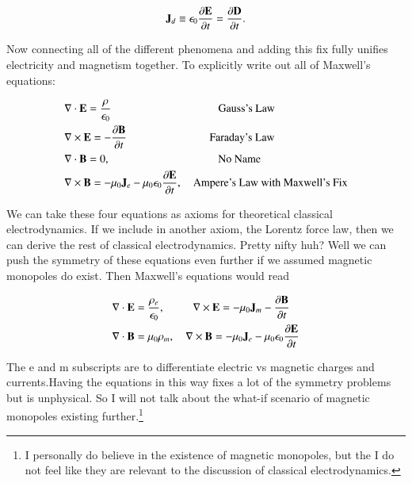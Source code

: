 \documentclass[preprint, review,12pt]{elsarticle}
\def\x{\times}
\def\.{\cdot}
\def\b{\textbf}
\def\={\equiv}
\def\div{\nabla \.}
\def\curl{\nabla \x}
\newcommand{\pd}[2]{\frac{\partial #1 }{\partial #2}}
\begin{document}
\begin{equation}
    \b J_d \= \epsilon_0 \pd{\b E}{t} = \pd{\b D}{t}.
\end{equation}

Now connecting all of the different phenomena and adding this fix fully unifies electricity and magnetism together. To explicitly write out all of Maxwell's equations:

\begin{equation}
\begin{split}
    & \div \b E  = \frac{\rho}{\epsilon_0} \hspace{97pt} \text{Gauss's Law}\\
    & \curl \b E  = - \pd{\b B}{t} \hspace{75pt} \text{Faraday's Law} \\
    & \div \b B  = 0, \hspace{98pt} \text{No Name}\\
    & \curl \b B  = -\mu_0 \b J_e - \mu_0\epsilon_0\pd{\b E}{t}, \quad \text{Ampere's Law with Maxwell's Fix}\\
\end{split}
\end{equation}

We can take these four equations as axioms for theoretical classical electrodynamics. If we include in another axiom, the Lorentz force law, then we can derive the rest of classical electrodynamics. Pretty nifty huh? Well we can push the symmetry of these equations even further if we assumed magnetic monopoles do exist. Then Maxwell's equations would read

\begin{equation}
\begin{split}
        & \div \b E  = \frac{\rho_e}{\epsilon_0}, \hspace{25.50pt} \curl \b E  = -\mu_0 \b J_m - \pd{\b B}{t} \\
        & \div \b B  = \mu_0 \rho_m, \quad  \curl \b B  = -\mu_0 \b J_e - \mu_0\epsilon_0\pd{\b E}{t}
\end{split}
\end{equation}

The e and m subscripts are to differentiate electric vs magnetic charges and currents.Having the equations in this way fixes a lot of the symmetry problems but is unphysical. So I will not talk about the what-if scenario of magnetic monopoles existing further.\footnote{I personally do believe in the existence of magnetic monopoles, but the I do not feel like they are relevant to the discussion of classical electrodynamics.}
    
\end{document}

